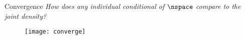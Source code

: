 \begin{block}{Convergence}
\large
    \emph{How does any individual conditional of $\nspace$ compare to the joint density?}

    \begin{figure}
        \texttt{[image: converge]}
    \end{figure}

\end{block}
\vspace{-1cm}
